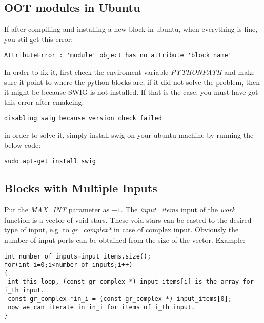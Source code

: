 \subsection{OOT modules in Ubuntu}

If after compilling and installing a new block in ubuntu, when everything is fine, you stil get this error:
\begin{footnotesize}
\begin{lstlisting}
AttributeError : 'module' object has no attribute 'block name'
\end{lstlisting}
\end{footnotesize}

In order to fix it, first check the enviroment variable \textit{PYTHONPATH} and make sure it point to where the python blocks are, if it did not solve the problem, then it might be because SWIG is not installed. If that is the case, you must have got this error after cmakeing:
\begin{footnotesize}
\begin{lstlisting}
disabling swig because version check failed
\end{lstlisting}
\end{footnotesize}
in order to solve it, simply install swig on your ubuntu machine by running the below code:
\begin{footnotesize}
\begin{lstlisting}
sudo apt-get install swig
\end{lstlisting}
\end{footnotesize}

\subsection{Blocks with Multiple Inputs}
Put the \textit{MAX\_INT} parameter as $-1$. The \textit{input\_items} input of the \textit{work} function is a vector of void stars. These void stars can be casted to the desired type of input, e.g. to \textit{gr\_complex*} in case of complex input. Obviously the number of input ports can be obtained from the size of the vector. Example:
\begin{footnotesize}
\begin{lstlisting}
int number_of_inputs=input_items.size();
for(int i=0;i<number_of_inputs;i++)
{
 int this loop, (const gr_complex *) input_items[i] is the array for i_th input.
 const gr_complex *in_i = (const gr_complex *) input_items[0];
 now we can iterate in in_i for items of i_th input.
}
\end{lstlisting}
\end{footnotesize}


